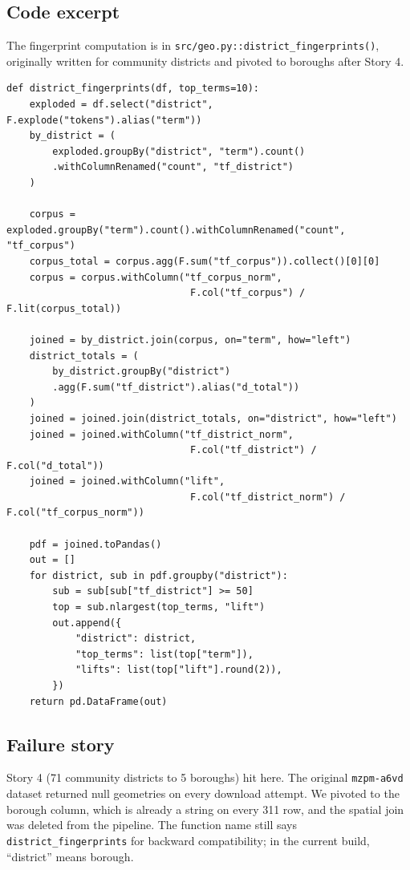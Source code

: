 \documentclass[11pt,letterpaper]{book}
\begin{document}
\subsection*{Code excerpt}

The fingerprint computation is in \texttt{src/geo.py::district\_fingerprints()}, originally written for community districts and pivoted to boroughs after Story 4.

\begin{lstlisting}
def district_fingerprints(df, top_terms=10):
    exploded = df.select("district", F.explode("tokens").alias("term"))
    by_district = (
        exploded.groupBy("district", "term").count()
        .withColumnRenamed("count", "tf_district")
    )

    corpus = exploded.groupBy("term").count().withColumnRenamed("count", "tf_corpus")
    corpus_total = corpus.agg(F.sum("tf_corpus")).collect()[0][0]
    corpus = corpus.withColumn("tf_corpus_norm",
                                F.col("tf_corpus") / F.lit(corpus_total))

    joined = by_district.join(corpus, on="term", how="left")
    district_totals = (
        by_district.groupBy("district")
        .agg(F.sum("tf_district").alias("d_total"))
    )
    joined = joined.join(district_totals, on="district", how="left")
    joined = joined.withColumn("tf_district_norm",
                                F.col("tf_district") / F.col("d_total"))
    joined = joined.withColumn("lift",
                                F.col("tf_district_norm") / F.col("tf_corpus_norm"))

    pdf = joined.toPandas()
    out = []
    for district, sub in pdf.groupby("district"):
        sub = sub[sub["tf_district"] >= 50]
        top = sub.nlargest(top_terms, "lift")
        out.append({
            "district": district,
            "top_terms": list(top["term"]),
            "lifts": list(top["lift"].round(2)),
        })
    return pd.DataFrame(out)
\end{lstlisting}

\subsection*{Failure story}

Story 4 (71 community districts to 5 boroughs) hit here. The original \texttt{mzpm-a6vd} dataset returned null geometries on every download attempt. We pivoted to the borough column, which is already a string on every 311 row, and the spatial join was deleted from the pipeline. The function name still says \texttt{district\_fingerprints} for backward compatibility; in the current build, ``district'' means borough.
\end{document}
